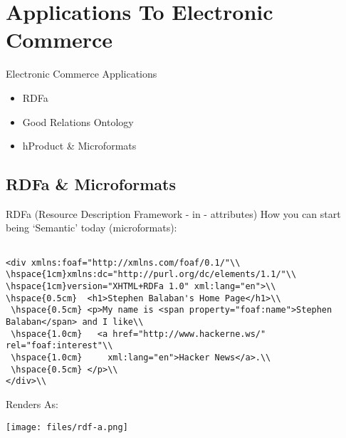 \documentclass{beamer}
\begin{document}
\section[Applications]{Applications To Electronic Commerce}
\begin{frame}
{\Large Electronic Commerce Applications}
\begin{itemize}
\item RDFa
\item Good Relations Ontology
\item hProduct \& Microformats
\end{itemize}
\end{frame}

\subsection[RDFa]{RDFa \& Microformats}
\begin{frame}{RDFa (Resource Description Framework - in - attributes)}
How you can start being `Semantic' today (microformats):
{\tiny\begin{verbatim}

<div xmlns:foaf="http://xmlns.com/foaf/0.1/"\\
\hspace{1cm}xmlns:dc="http://purl.org/dc/elements/1.1/"\\
\hspace{1cm}version="XHTML+RDFa 1.0" xml:lang="en">\\
\hspace{0.5cm}  <h1>Stephen Balaban's Home Page</h1>\\
 \hspace{0.5cm} <p>My name is <span property="foaf:name">Stephen Balaban</span> and I like\\
 \hspace{1.0cm}   <a href="http://www.hackerne.ws/" rel="foaf:interest"\\
 \hspace{1.0cm}     xml:lang="en">Hacker News</a>.\\
 \hspace{0.5cm} </p>\\
</div>\\
\end{verbatim}}
Renders As:\\
\vspace{0.25cm}

\texttt{[image: files/rdf-a.png]}
\end{frame}
\end{document}
